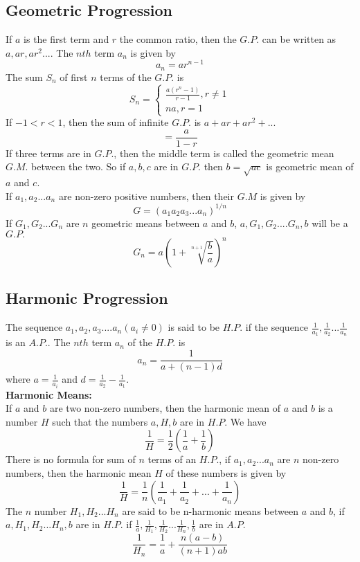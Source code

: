 \documentclass[12pt]{article}
\begin{document}
\subsection{Geometric Progression}
If $a$ is the first term and $r$ the common ratio, then the $G.P.$ can be written as $a,ar,ar^2...$. The $nth$ term $a_n$ is given by 
$$a_n=ar^{n-1}$$ The sum $S_n$ of first $n$ terms of the $G.P.$ is 
$$S_n=
\begin{cases}
  \frac{a(r^n -1)}{r-1}, r \not= 1 \\
   na,r=1\
\end{cases} $$ If $-1<r<1$, then the sum of infinite $G.P.$ is $a+ar+ar^2+...$ $$=\frac{a}{1-r}$$
If three terms are in $G.P.$, then the middle term is called the geometric mean $G.M.$ between the two. So if $a,b,c$ are in $G.P.$ then  $b=\sqrt{ac}$ is geometric mean of $a$ and $c$.\\
If $a_1,a_2...a_n$ are non-zero positive numbers, then their $G.M$ is given by $$G=(a_1a_2a_3...a_n)^{1/n}$$
If $G_1,G_2...G_n$ are $n$ geometric means between $a$ and $b$, $a,G_1,G_2....G_n,b$ will be a $G.P.$ $$G_n=a(1+ \sqrt[n+1]{\frac{b}{a}})^{n}$$
\subsection{Harmonic Progression}
The sequence $a_1,a_2,a_3....a_n(a_i \not= 0)$ is said to be $H.P.$ if the sequence $\frac{1}{a_1},\frac{1}{a_2}...\frac{1}{a_n}$ is an $A.P.$. The $nth$ term $a_n$ of the $H.P.$ is $$a_n=\frac{1}{a+(n-1)d}$$ where $a=\frac{1}{a_i}$ and $d=\frac{1}{a_2}-\frac{1}{a_1}$.\\
\textbf{Harmonic Means:}\\
If $a$ and $b$ are two non-zero numbers, then the harmonic mean of $a$ and $b$ is a number $H$ such that the numbers $a,H,b$ are in $H.P.$ We have $$\frac{1}{H}=\frac{1}{2}(\frac{1}{a}+\frac{1}{b})$$
There is no formula for sum of $n$  terms of an $H.P.$, if $a_1,a_2...a_n$ are $n$ non-zero numbers, then the harmonic mean $H$ of these numbers is given by  $$\frac{1}{H}=\frac{1}{n}(\frac{1}{a_1}+\frac{1}{a_2}+...+\frac{1}{a_n})$$
The $n$ number $H_1,H_2...H_n$ are said to be n-harmonic means between 
$a$ and $b$, if $a,H_1,H_2...H_n,b$ are in $H.P.$ if $\frac{1}{a},
\frac{1}{H_1},\frac{1}{H_2}...\frac{1}{H_n},\frac{1}{b}$ are in $A.P.$ 
$$\frac{1}{H_n}=\frac{1}{a}+\frac{n(a-b)}{(n+1)ab}$$
\end{document}
